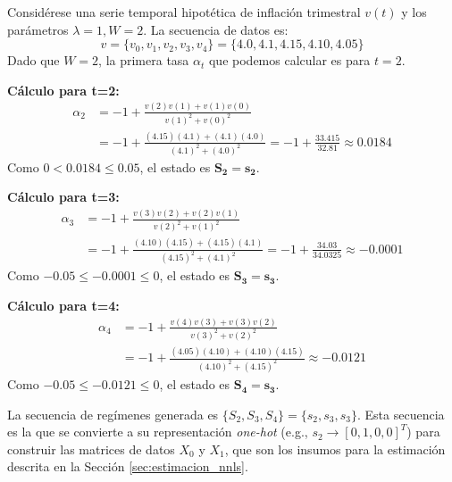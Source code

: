 \begin{examplex}
\label{ex:discretizacion_inflacion}

Considérese una serie temporal hipotética de inflación trimestral \(v(t)\) y los parámetros \(\lambda=1, W=2\). La secuencia de datos es:
\[ v = \{v_0, v_1, v_2, v_3, v_4\} = \{4.0, 4.1, 4.15, 4.10, 4.05 \} \]
Dado que \(W=2\), la primera tasa \(\alpha_t\) que podemos calcular es para \(t=2\).

\textbf{Cálculo para t=2:}
\begin{align*}
    \alpha_{2} &= -1 + \frac{v(2)v(1) + v(1)v(0)}{v(1)^2 + v(0)^2} \\
    &= -1 + \frac{(4.15)(4.1) + (4.1)(4.0)}{(4.1)^2 + (4.0)^2} = -1 + \frac{33.415}{32.81} \approx 0.0184
\end{align*}
Como \(0 < 0.0184 \leq 0.05\), el estado es \(\mathbf{S_2 = s_2}\).

\textbf{Cálculo para t=3:}
\begin{align*}
    \alpha_{3} &= -1 + \frac{v(3)v(2) + v(2)v(1)}{v(2)^2 + v(1)^2} \\
    &= -1 + \frac{(4.10)(4.15) + (4.15)(4.1)}{(4.15)^2 + (4.1)^2} = -1 + \frac{34.03}{34.0325} \approx -0.0001
\end{align*}
Como \(-0.05 \leq -0.0001 \leq 0\), el estado es \(\mathbf{S_3 = s_3}\).

\textbf{Cálculo para t=4:}
\begin{align*}
    \alpha_{4} &= -1 + \frac{v(4)v(3) + v(3)v(2)}{v(3)^2 + v(2)^2} \\
    &= -1 + \frac{(4.05)(4.10) + (4.10)(4.15)}{(4.10)^2 + (4.15)^2} \approx -0.0121
\end{align*}
Como \(-0.05 \leq -0.0121 \leq 0\), el estado es \(\mathbf{S_4 = s_3}\).

La secuencia de regímenes generada es \(\{S_2, S_3, S_4\} = \{s_2, s_3, s_3\}\). Esta secuencia es la que se convierte a su representación \textit{one-hot} (e.g., \(s_2 \rightarrow [0, 1, 0, 0]^T\)) para construir las matrices de datos \(X_0\) y \(X_1\), que son los insumos para la estimación descrita en la Sección \ref{sec:estimacion_nnls}.
\end{examplex}

